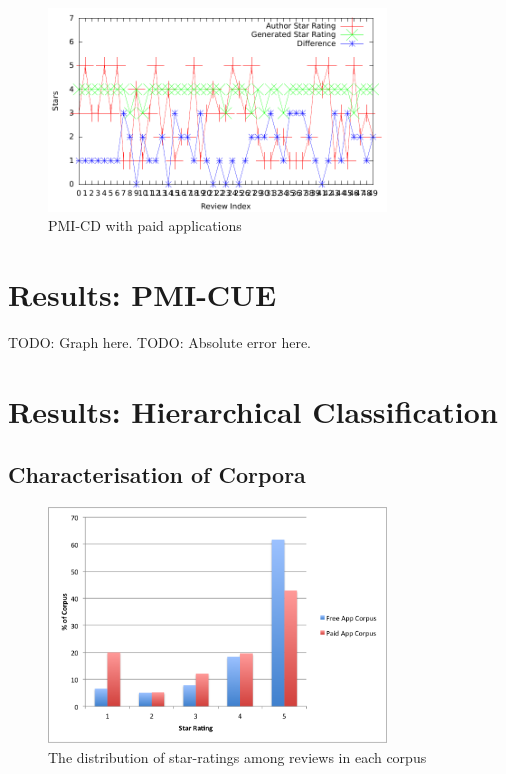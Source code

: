 \documentclass[11pt]{report} %
\begin{document}
	\begin{figure}[H]
	\centering
	\includegraphics[width=0.8\textwidth]{data/pmi-cd-paid.pdf}
	\caption{PMI-CD with paid applications}
	\label{fig:pmi-cd-paid}
	\end{figure}

\section{Results: PMI-CUE}
TODO: Graph here.
TODO: Absolute error here.

\section{Results: Hierarchical Classification}

	\subsection{Characterisation of Corpora} 

	\begin{figure}[H]
	\centering
	\includegraphics[width=0.8\textwidth]{data/dist_corpora.png}
	\caption{The distribution of star-ratings among reviews in each corpus}
	\label{fig:pmi-hc-corp-dist}
	\end{figure}
\end{document}
